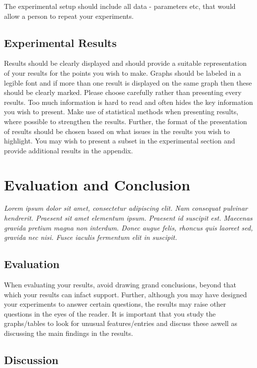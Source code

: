 \documentclass[a4paper]{book}
\begin{document}
The experimental setup should include all data - parameters etc, that would allow a person to repeat your experiments.

\section{Experimental Results}
\label{sec:experimentalResults}

Results should be clearly displayed and should provide a suitable representation of your results for the points you wish to make. Graphs should be labeled in a legible font and if more than one result is displayed on the same graph then these should be clearly marked.   Please choose carefully rather than presenting every results. Too much information is hard to read and often hides the key information you wish to present. Make use of statistical methods when presenting results, where possible to strengthen the results.  Further, the format of the presentation of results should be chosen based on what issues in the results you wish to highlight. You may wish to present a subset in the experimental section and provide additional results in the appendix.

\chapter{Evaluation and Conclusion}
\label{cha:evaluationAndConclusion}

{\it Lorem ipsum dolor sit amet, consectetur adipiscing elit. Nam consequat pulvinar hendrerit. Praesent sit amet elementum ipsum. Praesent id suscipit est. Maecenas gravida pretium magna non interdum. Donec augue felis, rhoncus quis laoreet sed, gravida nec nisi. Fusce iaculis fermentum elit in suscipit. }

\section{Evaluation}
\label{sec:Evaluation}

When evaluating your results, avoid drawing grand conclusions, beyond that which your results can infact support. Further, although you may have designed your experiments to answer certain questions, the results may raise other questions in the eyes of the reader. It is important that you study the graphs/tables to look for unusual features/entries and discuss these aswell as discussing the main findings in the results.

\section{Discussion}
\label{sec:Discussion}
\end{document}
